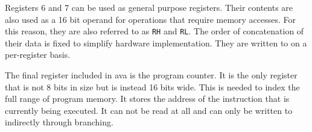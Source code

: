Registers 6 and 7 can be used as general purpose registers. Their contents are also used as a 16 bit operand for operations that require memory accesses. For this reason, they are also referred to as \texttt{RH} and \texttt{RL}. The order of concatenation of their data is fixed to simplify hardware implementation. They are written to on a per-register basis.

The final register included in \ac{ava} is the program counter. It is the only register that is not 8 bits in size but is instead 16 bits wide. This is needed to index the full range of program memory. It stores the address of the instruction that is currently being executed. It can not be read at all and can only be written to indirectly through branching.
